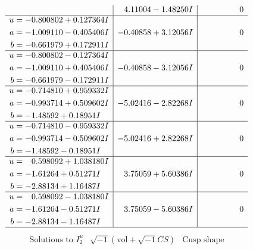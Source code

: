 \documentclass[1p]{elsarticle_modified}
\theoremstyle{definition}
\newcommand{\I}{\sqrt{-1}}
\begin{document}
$$\begin{array}{c|c|c}
 & \phantom{-}4.11004 - 1.48250 I & \phantom{-0.000000 } 0 \\ \hline\begin{aligned}
u &= -0.800802 + 0.127364 I \\
a &= -1.009110 - 0.405406 I \\
b &= -0.661979 + 0.172911 I\end{aligned}
 & -0.40858 + 3.12056 I & \phantom{-0.000000 } 0 \\ \hline\begin{aligned}
u &= -0.800802 - 0.127364 I \\
a &= -1.009110 + 0.405406 I \\
b &= -0.661979 - 0.172911 I\end{aligned}
 & -0.40858 - 3.12056 I & \phantom{-0.000000 } 0 \\ \hline\begin{aligned}
u &= -0.714810 + 0.959332 I \\
a &= -0.993714 + 0.509602 I \\
b &= -1.48592 + 0.18951 I\end{aligned}
 & -5.02416 - 2.82268 I & \phantom{-0.000000 } 0 \\ \hline\begin{aligned}
u &= -0.714810 - 0.959332 I \\
a &= -0.993714 - 0.509602 I \\
b &= -1.48592 - 0.18951 I\end{aligned}
 & -5.02416 + 2.82268 I & \phantom{-0.000000 } 0 \\ \hline\begin{aligned}
u &= \phantom{-}0.598092 + 1.038180 I \\
a &= -1.61264 + 0.51271 I \\
b &= -2.88134 + 1.16487 I\end{aligned}
 & \phantom{-}3.75059 + 5.60386 I & \phantom{-0.000000 } 0 \\ \hline\begin{aligned}
u &= \phantom{-}0.598092 - 1.038180 I \\
a &= -1.61264 - 0.51271 I \\
b &= -2.88134 - 1.16487 I\end{aligned}
 & \phantom{-}3.75059 - 5.60386 I & \phantom{-0.000000 } 0\\
 \hline 
 \end{array}$$\newpage$$\begin{array}{c|c|c}  
\text{Solutions to }I^u_{2}& \I (\text{vol} + \sqrt{-1}CS) & \text{Cusp shape}\\

\end{array}$$
\end{document}
